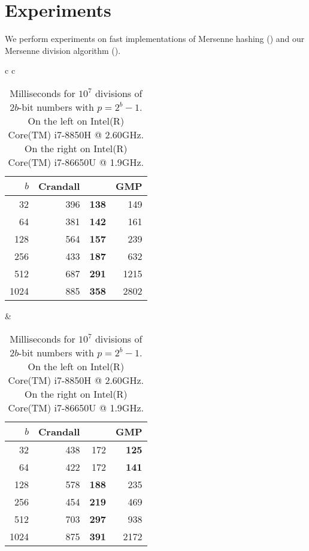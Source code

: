 \section{Experiments}
We perform experiments on fast implementations of Mersenne hashing () and our Mersenne division algorithm ().



\begin{table}[H]
   \centering
   \begin{tabular}{ c c }
      \begin{tabular}{ r | r r r }
         $b$ & Crandall & \Cref{alg:division-generalized} & GMP \\
         \hline
         32 & 396 & \textbf   {138}  & 149\\
         64 & 381 &   \textbf {142}  & 161\\
         128 & 564 &  \textbf {157}  & 239\\
         256 & 433 &  \textbf {187}  & 632\\
         512 & 687 &  \textbf {291}  & 1215\\
         1024 & 885 & \textbf {358}  & 2802
      \end{tabular}
      \hspace{.5em}
      &
      \hspace{.5em}
      \begin{tabular}{ r | r r r }
         $b$ & Crandall & \Cref{alg:division-generalized} & GMP \\
         \hline
         32 & 438 & 172 & \textbf{125}\\
         64 & 422 & 172 & \textbf{141}\\
         128 & 578 &      \textbf{188} & 235\\
         256 & 454 &      \textbf{219} & 469\\
         512 & 703 &      \textbf{297} & 938\\
         1024 & 875 &     \textbf{391} & 2172\\

      \end{tabular}
   \end{tabular}
   \caption{Milliseconds for $10^7$ divisions of $2b$-bit numbers with $p=2^b-1$.
         On the left on Intel(R) Core(TM) i7-8850H @ 2.60GHz.
      On the right on Intel(R) Core(TM) i7-86650U @ 1.9GHz.
   }
\end{table}
